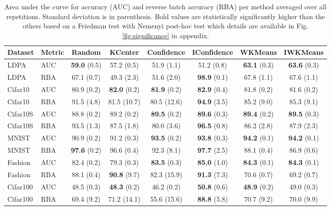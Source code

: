 \documentclass[runningheads]{llncs}
\def\bf{\bfseries}
\begin{document}
\begin{table}[hbtp]

  \caption{Area under the curve for accuracy (AUC) and reverse batch accuracy (RBA) per method averaged over all repetitions. Standard deviation is in parenthesis. Bold values are statistically significantly higher than the others based on a Friedman test with Nemenyi post-hoc test which details are available in Fig. \ref{fig:significance} in appendix.}
  \label{tab:synthetic}

  \centering

\begin{tabular}{llcccccc}
  \hline
  Dataset  & Metric                & Random          & KCenter          & Confidence       & IConfidence     & WKMeans         & IWKMeans         \\
  \hline          
  LDPA     & AUC                   & {\bf 59.0} (0.5)&    57.2 (0.5)    &   51.9  (1.1)    &    51.2  (0.8)  & {\bf 63.1} (0.3)& {\bf 63.6} (0.3) \\
  LDPA     & RBA                   &    67.1 (0.7)   &    49.3 (2.3)    &   51.6  (2.0)    &{\bf 98.9} (0.1) &    67.8 (1.1)   &       67.6 (1.1) \\
  \hline          
  Cifar10  & AUC                   &    80.9 (0.2)   & {\bf 82.0} (0.2) & {\bf 81.9} (0.2) &{\bf 82.9} (0.4) &    81.8 (0.2)   &       81.6 (0.2) \\
  Cifar10  & RBA                   &    91.5 (4.8)   &   81.5 (10.7)    &   80.5 (12.6)    &{\bf 94.9} (3.5) &    85.2 (9.0)   &       85.3 (9.1) \\
  \hline   
  Cifar10S & AUC                   &    88.8 (0.2)   &   89.2  (0.2)    & {\bf 89.5} (0.2) &{\bf 89.6} (0.3) &{\bf 89.4} (0.2) & {\bf 89.5} (0.3) \\
  Cifar10S & RBA                   &    93.5 (1.3)   &   87.5  (1.8)    &   80.0  (3.6)    &{\bf 96.5} (0.8) &    86.2 (2.8)   &       87.9 (2.3) \\
  \hline            
  MNIST    & AUC                   &    90.9 (0.2)   &   91.2  (0.3)    & {\bf 93.5} (0.2) &{\bf 93.8} (0.3) & {\bf 94.2} (0.1)& {\bf 94.2} (0.1) \\
  MNIST    & RBA                   &{\bf 97.6} (0.2) &   96.6  (0.4)    &   92.3  (8.1)    &{\bf 97.7} (2.5) &    88.1 (0.4)   &       86.9 (0.6) \\
  \hline            
  Fashion  & AUC                   &    82.4 (0.2)   &   79.3  (0.3)    & {\bf 83.5}  (0.3)&{\bf 85.0} (1.0) & {\bf 84.3} (0.1)& {\bf 84.3} (0.1) \\
  Fashion  & RBA                   &    88.1 (0.4)   &{\bf 90.8}  (9.7) &   82.3 (15.9)    &{\bf 91.3} (7.3) &    70.6 (0.7)   &       69.2 (0.7) \\
  \hline              
  Cifar100 & AUC                   &    48.5 (0.3)   & {\bf 48.3} (0.2) &   46.2  (0.2)    &{\bf 50.8} (0.6) & {\bf 48.9} (0.2)&       49.0 (0.3) \\
  Cifar100 & RBA                   &    69.4 (9.2)   &   71.2 (14.1)    &   55.6 (15.6)    &{\bf 88.8} (5.8) &    70.7 (9.2)   &       70.0 (9.9) \\
  \hline
\end{tabular}
\end{table}
\end{document}
